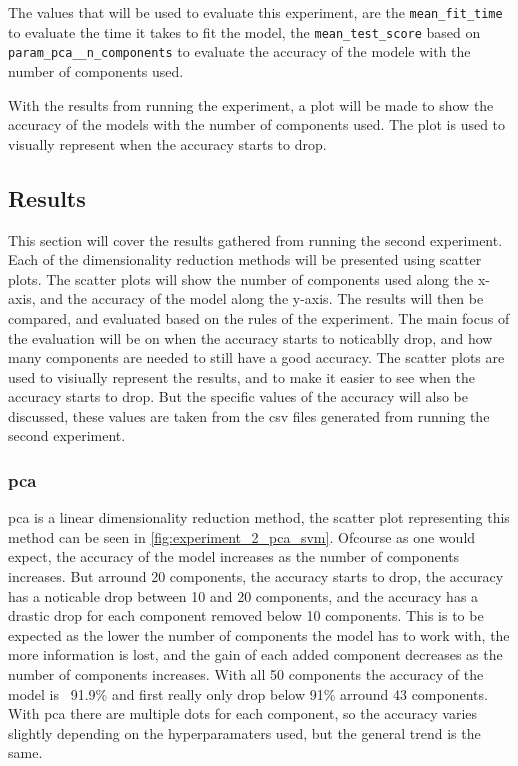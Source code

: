 The values that will be used to evaluate this experiment, are the \texttt{mean\_fit\_time} to evaluate the time it takes to fit the model, the \texttt{mean\_test\_score} based on \texttt{param\_pca\_\_n\_components} to evaluate the accuracy of the modele with the number of components used.

With the results from running the experiment, a plot will be made to show the accuracy of the models with the number of components used. The plot is used to visually represent when the accuracy starts to drop. 


\subsection{Results}\label{subsec:experiment_2_results}
This section will cover the results gathered from running the second experiment. Each of the dimensionality reduction methods will be presented using scatter plots. The scatter plots will show the number of components used along the x-axis, and the accuracy of the model along the y-axis. The results will then be compared, and evaluated based on the rules of the experiment. The main focus of the evaluation will be on when the accuracy starts to noticablly drop, and how many components are needed to still have a good accuracy. The scatter plots are used to visiually represent the results, and to make it easier to see when the accuracy starts to drop. But the specific values of the accuracy will also be discussed, these values are taken from the csv files generated from running the second experiment. 

\subsubsection{\gls{pca}}\label{subsubsec:experiment_2_pca}
\gls{pca} is a linear dimensionality reduction method, the scatter plot representing this method can be seen in \autoref{fig:experiment_2_pca_svm}. Ofcourse as one would expect, the accuracy of the model increases as the number of components increases. But arround 20 components, the accuracy starts to drop, the accuracy has a noticable drop between 10 and 20 components, and the accuracy has a drastic drop for each component removed below 10 components. This is to be expected as the lower the number of components the model has to work with, the more information is lost, and the gain of each added component decreases as the number of components increases. With all 50 components the accuracy of the model is ~91.9\% and first really only drop below 91\% arround 43 components. With \gls{pca} there are multiple dots for each component, so the accuracy varies slightly depending on the hyperparamaters used, but the general trend is the same.

